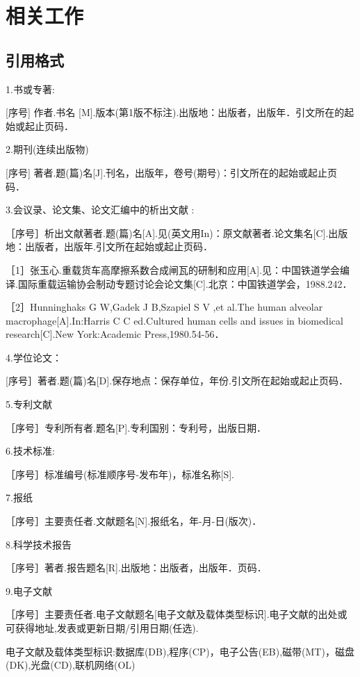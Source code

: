 \chapter{相关工作}

\section{引用格式}
 1.书或专著:
 
	[序号] 作者.书名 [M].版本(第1版不标注).出版地：出版者，出版年．引文所在的起始或起止页码． 
	
 2.期刊(连续出版物)  
 
   [序号] 著者.题(篇)名[J].刊名，出版年，卷号(期号)：引文所在的起始或起止页码．
   
 3.会议录、论文集、论文汇编中的析出文献 : 
 
  ［序号］析出文献著者.题(篇)名[A].见(英文用In)：原文献著者.论文集名[C].出版地：出版者，出版年.引文所在起始或起止页码．
  
  ［1］张玉心.重载货车高摩擦系数合成闸瓦的研制和应用[A].见：中国铁道学会编译.国际重载运输协会制动专题讨论会论文集[C].北京：中国铁道学会，1988.242． 
  
  ［2］Hunninghaks G W,Gadek J B,Szapiel S V ,et al.The human alveolar macrophage[A].In:Harris C C ed.Cultured human cells and issues in biomedical research[C].New York:Academic Press,1980.54-56．
  
 4.学位论文：
 
	[序号］著者.题(篇)名[D].保存地点：保存单位，年份.引文所在起始或起止页码．
	
 5.专利文献 
 
  ［序号］专利所有者.题名[P].专利国别：专利号，出版日期． 
  
 6.技术标准:
 
  ［序号］标准编号(标准顺序号-发布年)，标准名称[S]. 
  
 7.报纸 
 
  ［序号］主要责任者.文献题名[N].报纸名，年-月-日(版次)． 
  
 8.科学技术报告
 
  ［序号］著者.报告题名[R].出版地：出版者，出版年．页码． 
  
 9.电子文献 
 
  ［序号］主要责任者.电子文献题名[电子文献及载体类型标识].电子文献的出处或可获得地址,发表或更新日期/引用日期(任选). 
  
 	电子文献及载体类型标识:数据库(DB),程序(CP)，电子公告(EB),磁带(MT)，磁盘(DK),光盘(CD),联机网络(OL)
 	
